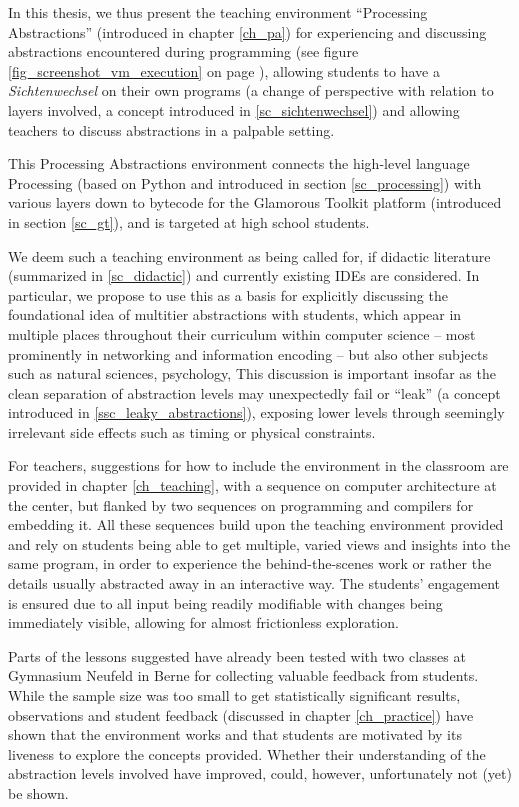 In this thesis, we thus present the teaching environment ``Processing Abstractions'' (introduced in chapter \ref{ch_pa}) for experiencing and discussing abstractions encountered during programming (see \eg figure \ref{fig_screenshot_vm_execution} on page \pageref{fig_screenshot_vm_execution}), allowing students to have a \emph{Sichtenwechsel} on their own programs (\ie a change of perspective with relation to layers involved, a concept introduced in \ref{sc_sichtenwechsel}) and allowing teachers to discuss abstractions in a palpable setting.

This Processing Abstractions environment connects the high-level language Processing (based on Python and introduced in section \ref{sc_processing}) with various layers down to bytecode for the Glamorous Toolkit platform (introduced in section \ref{sc_gt}), and is targeted at high school students.

We deem such a teaching environment as being called for, if didactic literature (summarized in \ref{sc_didactic}) and currently existing \acp{IDE} are considered. In particular, we propose to use this as a basis for explicitly discussing the foundational idea of multitier abstractions with students, which appear in multiple places throughout their curriculum within computer science -- most prominently in networking and information encoding -- but also other subjects such as natural sciences, psychology, \etc This discussion is important insofar as the clean separation of abstraction levels may unexpectedly fail or ``leak'' (a concept introduced in \ref{ssc_leaky_abstractions}), exposing lower levels through seemingly irrelevant side effects such as timing or physical constraints.

For teachers, suggestions for how to include the environment in the classroom are provided in chapter \ref{ch_teaching}, with a sequence on computer architecture at the center, but flanked by two sequences on programming and compilers for embedding it. All these sequences build upon the teaching environment provided and rely on students being able to get multiple, varied views and insights into the same program, in order to experience the behind-the-scenes work or rather the details usually abstracted away in an interactive way. The students' engagement is ensured due to all input being readily modifiable with changes being immediately visible, allowing for almost frictionless exploration.

Parts of the lessons suggested have already been tested with two classes at Gymnasium Neufeld in Berne for collecting valuable feedback from students. While the sample size was too small to get statistically significant results, observations and student feedback (discussed in chapter \ref{ch_practice}) have shown that the environment works and that students are motivated by its liveness to explore the concepts provided. Whether their understanding of the abstraction levels involved have improved, could, however, unfortunately not (yet) be shown.

